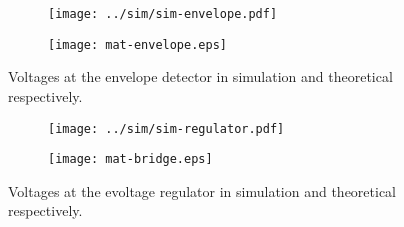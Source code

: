 \begin{figure}[ht]
\centering
\begin{subfigure}{.5\textwidth}
  \centering
  \texttt{[image: ../sim/sim-envelope.pdf]}
\end{subfigure}%
\begin{subfigure}{.4\textwidth}
  \centering
  \texttt{[image: mat-envelope.eps]}
\end{subfigure}
\caption{Voltages at the envelope detector in simulation and theoretical respectively.}
\label{fig:sbs1}
\end{figure}

\begin{figure}[ht]
\centering
\begin{subfigure}{.5\textwidth}
  \centering
  \texttt{[image: ../sim/sim-regulator.pdf]}
\end{subfigure}%
\begin{subfigure}{.4\textwidth}
  \centering
  \texttt{[image: mat-bridge.eps]}
\end{subfigure}
\caption{Voltages at the evoltage regulator in simulation and theoretical respectively.}
\label{fig:sbs2}
\end{figure}